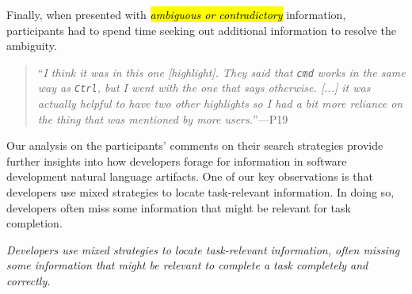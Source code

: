 Finally, when presented with \hl{\textit{ambiguous or contradictory}} information, participants had to spend time seeking out additional information to resolve the ambiguity.


\smallskip
\begin{footnotesize}
\begin{quote}
    ``\textit{I think it was in this one [highlight]. They said that \texttt{cmd} works in the same way as \texttt{Ctrl}, but I went with the one that says otherwise. [...] it was actually helpful to have two other highlights so I had a bit more reliance on the thing that was mentioned by more users.}''---P19
\end{quote}
\end{footnotesize}



Our analysis on the participants' comments on their search strategies provide further insights into how developers forage for information in software development natural language artifacts. One of our key observations is that  developers use mixed strategies to locate task-relevant information. In doing so, developers often miss some information that might be relevant for task completion.


\medskip
\begin{bluequote}
    \textit{Developers use mixed strategies to locate task-relevant information, often missing some information that might be relevant to complete a task completely and correctly.}
\end{bluequote}


